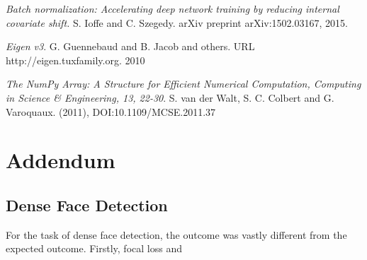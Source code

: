 \documentclass[a4paper, twoside]{article}
\begin{document}
\begin{thebibliography}{99}
	\textit{Batch normalization: Accelerating deep network training by reducing internal covariate shift.}
    S. Ioffe and C. Szegedy. 
	arXiv preprint arXiv:1502.03167, 2015.

\textit{Eigen v3}.
G. Guennebaud and B. Jacob and others. URL http://eigen.tuxfamily.org. 2010

\textit{The NumPy Array: A Structure for Efficient Numerical Computation, Computing in Science \& Engineering, 13, 22-30}.
S. van der Walt, S. C. Colbert and G. Varoquaux.  (2011), DOI:10.1109/MCSE.2011.37 

\end{thebibliography}

\newpage
\section*{Addendum}
\subsection*{Dense Face Detection}
For the task of dense face detection, the outcome was vastly different from the expected outcome. Firstly, focal loss and 
\end{document}
